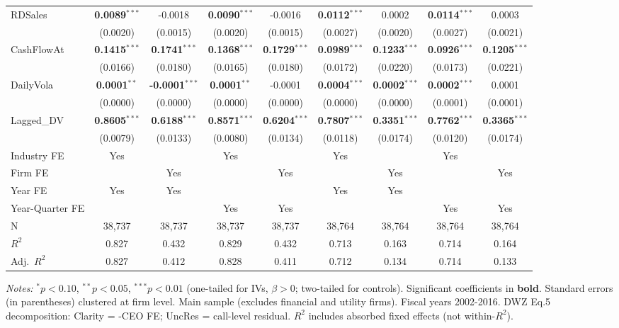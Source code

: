 \documentclass[11pt,a4paper]{article}
\begin{document}
\begin{table}[htbp]
\begin{tabular}{lcccccccc}
RDSales & \textbf{0.0089}$^{***}$ & -0.0018 & \textbf{0.0090}$^{***}$ & -0.0016 & \textbf{0.0112}$^{***}$ & 0.0002 & \textbf{0.0114}$^{***}$ & 0.0003 \\
 & (0.0020) & (0.0015) & (0.0020) & (0.0015) & (0.0027) & (0.0020) & (0.0027) & (0.0021) \\
CashFlowAt & \textbf{0.1415}$^{***}$ & \textbf{0.1741}$^{***}$ & \textbf{0.1368}$^{***}$ & \textbf{0.1729}$^{***}$ & \textbf{0.0989}$^{***}$ & \textbf{0.1233}$^{***}$ & \textbf{0.0926}$^{***}$ & \textbf{0.1205}$^{***}$ \\
 & (0.0166) & (0.0180) & (0.0165) & (0.0180) & (0.0172) & (0.0220) & (0.0173) & (0.0221) \\
DailyVola & \textbf{0.0001}$^{**}$ & \textbf{-0.0001}$^{***}$ & \textbf{0.0001}$^{**}$ & -0.0001 & \textbf{0.0004}$^{***}$ & \textbf{0.0002}$^{***}$ & \textbf{0.0002}$^{***}$ & 0.0001 \\
 & (0.0000) & (0.0000) & (0.0000) & (0.0000) & (0.0000) & (0.0000) & (0.0001) & (0.0001) \\
Lagged\_DV & \textbf{0.8605}$^{***}$ & \textbf{0.6188}$^{***}$ & \textbf{0.8571}$^{***}$ & \textbf{0.6204}$^{***}$ & \textbf{0.7807}$^{***}$ & \textbf{0.3351}$^{***}$ & \textbf{0.7762}$^{***}$ & \textbf{0.3365}$^{***}$ \\
 & (0.0079) & (0.0133) & (0.0080) & (0.0134) & (0.0118) & (0.0174) & (0.0120) & (0.0174) \\
\midrule
Industry FE & Yes &  & Yes &  & Yes &  & Yes &  \\
Firm FE &  & Yes &  & Yes &  & Yes &  & Yes \\
Year FE & Yes & Yes &  &  & Yes & Yes &  &  \\
Year-Quarter FE &  &  & Yes & Yes &  &  & Yes & Yes \\
\midrule
N & 38,737 & 38,737 & 38,737 & 38,737 & 38,764 & 38,764 & 38,764 & 38,764 \\
$R^2$ & 0.827 & 0.432 & 0.829 & 0.432 & 0.713 & 0.163 & 0.714 & 0.164 \\
Adj.~$R^2$ & 0.827 & 0.412 & 0.828 & 0.411 & 0.712 & 0.134 & 0.714 & 0.133 \\
\bottomrule
\end{tabular}
\begin{minipage}{\linewidth}
\vspace{2pt}\scriptsize
\textit{Notes:} $^{*}p<0.10$, $^{**}p<0.05$, $^{***}p<0.01$ (one-tailed for IVs, $\beta > 0$; two-tailed for controls).
 Significant coefficients in \textbf{bold}.
 Standard errors (in parentheses) clustered at firm level.
 Main sample (excludes financial and utility firms). Fiscal years 2002-2016. DWZ Eq.5 decomposition: Clarity = -CEO FE; UncRes = call-level residual.
 $R^2$ includes absorbed fixed effects (not within-$R^2$).
\end{minipage}
\end{table}
\end{document}
